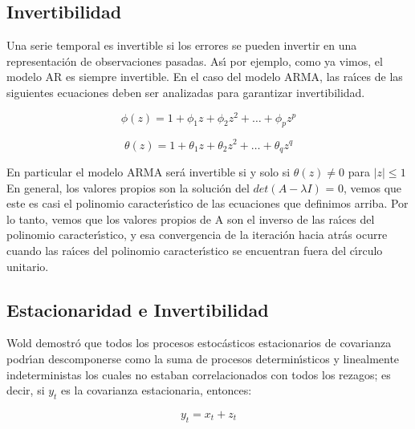 \subsection{Invertibilidad}
Una serie temporal es invertible si los errores se pueden invertir en una representaci\'on de observaciones pasadas. As\'{\i} por ejemplo, como ya vimos, el modelo AR es siempre invertible.
En el caso del modelo ARMA, las ra\'{\i}ces de las siguientes ecuaciones deben ser analizadas para garantizar invertibilidad.

\begin{equation}
\phi (z) = 1 + \phi_1 z + \phi_2 z^2 + \dots{} + \phi_p z^p
\end{equation}

\begin{equation}
\theta(z) =  1 + \theta_1 z + \theta_2 z^2 + \dots{} + \theta_q z^q
\end{equation}

En particular el modelo ARMA ser\'a invertible si y solo si $\theta(z) \ne 0$ para $|z| \le 1$
En general, los valores propios son la soluci\'on del $det (A - \lambda I)$ = 0, vemos que este es casi el polinomio caracter\'{\i}stico de las ecuaciones que definimos arriba. Por lo tanto, vemos que los valores propios de A son el inverso de las ra\'{\i}ces del polinomio caracter\'{\i}stico, y esa convergencia de la iteraci\'on hacia atr\'as ocurre cuando las ra\'{\i}ces del polinomio caracter\'{\i}stico se encuentran fuera del c\'{\i}rculo unitario.


\subsection{Estacionaridad e Invertibilidad}
Wold demostr\'o que todos los procesos estoc\'asticos estacionarios de covarianza podr\'{\i}an descomponerse como la suma de
procesos determin\'{\i}sticos y linealmente indeterministas los cuales no estaban correlacionados con todos los rezagos; es decir,
si $y_t$ es la covarianza estacionaria, entonces:

\begin{equation}
y_t = x_t + z_t
\end{equation}

